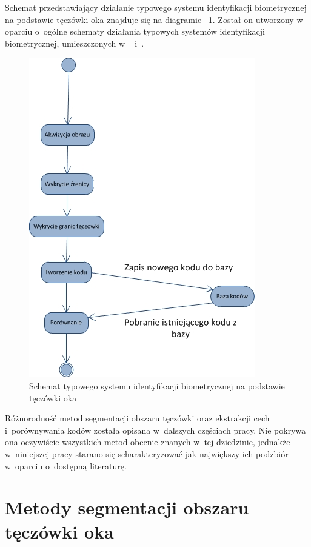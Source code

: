 Schemat przedstawiający działanie typowego systemu identyfikacji biometrycznej na podstawie tęczówki oka znajduje się na diagramie ~\ref{fig:identyfikacja}. Został on utworzony w oparciu o~ogólne schematy działania typowych systemów identyfikacji biometrycznej, umieszczonych w ~\cite{Bio02} i~\cite{Jain00}.
\begin{figure}[b]
\begin{center}
\includegraphics{schemat.jpg}
\caption{Schemat typowego systemu identyfikacji biometrycznej na podstawie tęczówki oka}
\label{fig:identyfikacja}
\end{center}
\end{figure}

Różnorodność metod segmentacji obszaru tęczówki oraz ekstrakcji cech i~porównywania kodów została opisana w~dalszych częściach pracy. Nie pokrywa ona oczywiście wszystkich metod obecnie znanych w~tej dziedzinie, jednakże w~niniejszej pracy starano się scharakteryzować jak największy ich podzbiór w~oparciu o~dostępną literaturę.


\section{Metody segmentacji obszaru tęczówki oka}
\label{sec:segmentacja}

